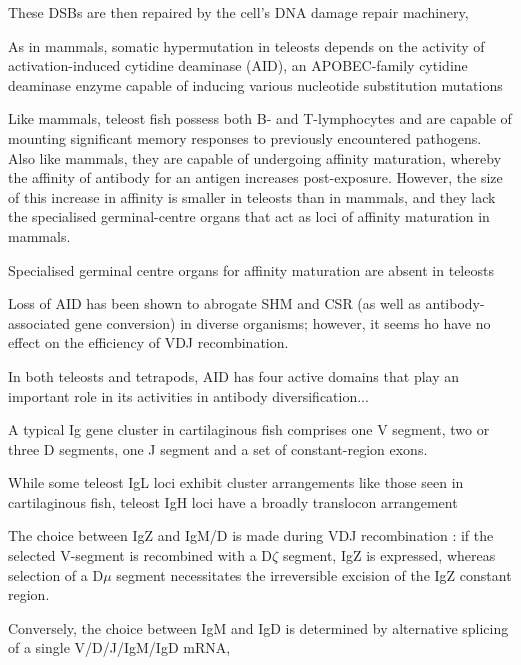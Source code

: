 
These DSBs are then repaired by the cell's DNA damage repair machinery, %


As in mammals, somatic hypermutation in teleosts depends on the activity of activation-induced cytidine deaminase (AID), an APOBEC-family cytidine deaminase enzyme capable of inducing various nucleotide substitution mutations 

Like mammals, teleost fish possess both B- and T-lymphocytes and are capable of mounting significant memory responses to previously encountered pathogens. Also like mammals, they are capable of undergoing affinity maturation, whereby the affinity of antibody for an antigen increases post-exposure. However, the size of this increase in affinity is smaller in teleosts than in mammals, and they lack the specialised germinal-centre organs that act as loci of affinity maturation in mammals.

Specialised germinal centre organs for affinity maturation are absent in teleosts %

Loss of AID has been shown to abrogate SHM and CSR (as well as antibody-associated gene conversion) in diverse organisms; however, it seems ho have no effect on the efficiency of VDJ recombination. 

In both teleosts and tetrapods, AID has four active domains that play an important role in its activities in antibody diversification...%

A typical Ig gene cluster in cartilaginous fish comprises one V segment, two or three D segments, one J segment and a set of constant-region exons.

While some teleost IgL loci exhibit cluster arrangements like those seen in cartilaginous fish, teleost IgH loci have a broadly translocon arrangement%

The choice between IgZ and IgM/D is made during VDJ recombination %
: if the selected V-segment is recombined with a D$\zeta$ segment, IgZ is expressed, whereas selection of a D$\mu$ segment necessitates the irreversible excision of the IgZ constant region. 

Conversely, the choice between IgM and IgD is determined by alternative splicing of a single V/D/J/IgM/IgD mRNA, %


